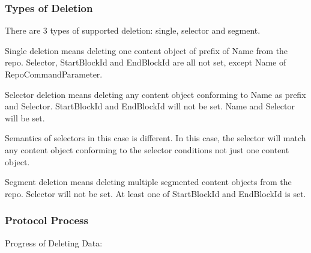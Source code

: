 \documentclass{acm_proc_article-sp}
\begin{document}
\subsubsection{Types of Deletion}
There are 3 types of supported deletion: single, selector and segment.

Single deletion means deleting one content object of prefix of Name from the repo. Selector, StartBlockId and EndBlockId are all not set, except Name of RepoCommandParameter.

Selector deletion means deleting any content object conforming to Name as prefix and Selector. StartBlockId and EndBlockId will not be set. Name and Selector will be set.

Semantics of selectors in this case is different. In this case, the selector will match any content object conforming to the selector conditions not just one content object.

Segment deletion means deleting multiple segmented content objects from the repo. Selector will not be set. At least one of StartBlockId and EndBlockId is set.

\subsubsection{Protocol Process}

Progress of Deleting Data:
\end{document}
